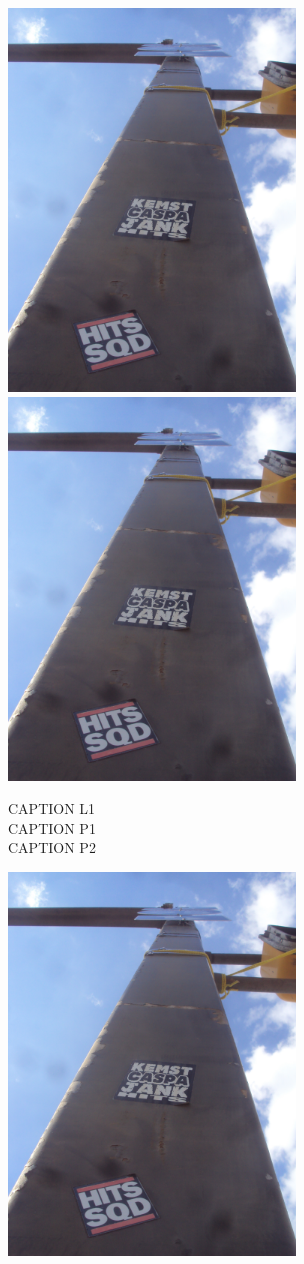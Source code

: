 \documentclass[10pt,letterpaper]{article}
\begin{document}
\vspace{0.25in}
\includegraphics[height=4in]{portrait.jpg}
\includegraphics[height=4in]{portrait.jpg}

CAPTION L1\\
CAPTION P1\\
CAPTION P2\\
\pagebreak

\includegraphics[height=4in]{portrait.jpg}
\end{document}
